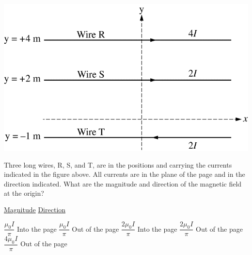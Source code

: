 
\begin{center}
    \includegraphics[scale=0.4]{images/img-008-015.png}
\end{center}

\begin{questions}
\setcounter{question}{13}

\question
Three long wires, R, S, and T, are in the positions and carrying the currents indicated in the figure above. All currents are in the plane of the page and in the direction indicated. What are the magnitude and direction of the magnetic field at the origin?

\tabto{0.75cm}\underline{Magnitude}
\tabto{3.00cm}\underline{Direction}

\begin{choices}
    \choice $\dfrac{\mu_{0} I}{\pi}$   \tabto{2.25cm} Into the page
    \choice $\dfrac{\mu_{0} I}{\pi}$   \tabto{2.25cm} Out of the page
    \choice $\dfrac{2 \mu_{0} I}{\pi}$ \tabto{2.25cm} Into the page
    \choice $\dfrac{2 \mu_{0} I}{\pi}$ \tabto{2.25cm} Out of the page
    \choice $\dfrac{4 \mu_{0} I}{\pi}$ \tabto{2.25cm} Out of the page
\end{choices}
\end{questions}
